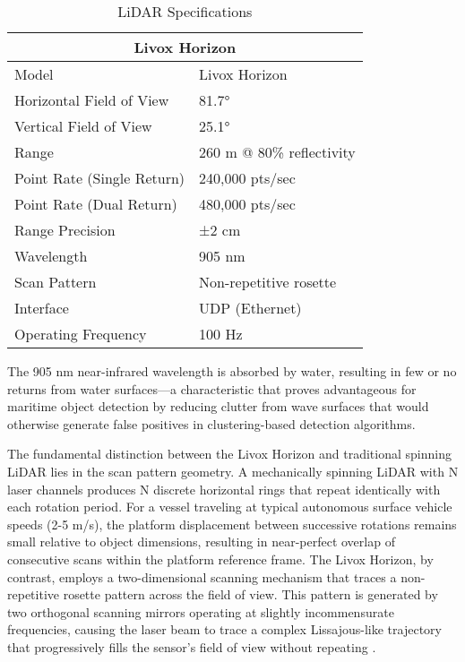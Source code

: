 \documentclass{erauthesis}
\begin{document}
\begin{table}[h]
\centering
\caption{LiDAR Specifications}
\begin{tabular}{ll}
\hline
\multicolumn{2}{c}{Livox Horizon}\\
\hline
\hline
Model & Livox Horizon \\
Horizontal Field of View & 81.7° \\
Vertical Field of View & 25.1° \\
Range & 260 m @ 80\% reflectivity \\
Point Rate (Single Return) & 240,000 pts/sec \\
Point Rate (Dual Return) & 480,000 pts/sec \\
Range Precision & ±2 cm \\
Wavelength & 905 nm \\
Scan Pattern & Non-repetitive rosette \\
Interface & UDP (Ethernet) \\
Operating Frequency & 100 Hz \\
\hline
\end{tabular}
\label{tab:livox_horizon_specs}
\end{table}

The 905 nm near-infrared wavelength is absorbed by water, resulting in few or no returns from water surfaces—a characteristic that proves advantageous for maritime object detection by reducing clutter from wave surfaces that would otherwise generate false positives in clustering-based detection algorithms.

The fundamental distinction between the Livox Horizon and traditional spinning \ac{LiDAR} lies in the scan pattern geometry.
A mechanically spinning \ac{LiDAR} with N laser channels produces N discrete horizontal rings that repeat identically with each rotation period.
For a vessel traveling at typical autonomous surface vehicle speeds (2-5 m/s), the platform displacement between successive rotations remains small relative to object dimensions, resulting in near-perfect overlap of consecutive scans within the platform reference frame.
The Livox Horizon, by contrast, employs a two-dimensional scanning mechanism that traces a non-repetitive rosette pattern across the field of view.
This pattern is generated by two orthogonal scanning mirrors operating at slightly incommensurate frequencies, causing the laser beam to trace a complex Lissajous-like trajectory that progressively fills the sensor's field of view without repeating \cite{thompson2023}.
\end{document}
